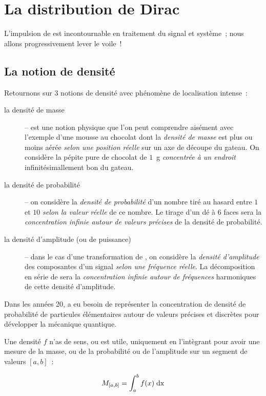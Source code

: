 \chapter{La distribution de Dirac}
\label{sec:dirac}

L'impulsion de \Dirac{} est incontournable en traitement du signal et
système~; nous allons progressivement lever le voile~!

\section{La notion de densité}

Retournons sur 3 notions de densité avec phénomène de localisation
intense~:
\begin{description}
\item [la densité de masse] -- est une notion physique que l'on peut
  comprendre aisément avec l'exemple d'une mousse au chocolat dont la
  \emph{densité de masse} est plus ou moins aérée \emph{selon une
    position réelle} sur un axe de découpe du gateau. On considère la
  pépite pure de chocolat de $1$~g \emph{concentrée à un endroit}
  infinitésimallement bon du gateau.
\item[la densité de probabilité] -- on considère la \emph{densité de
    probabilité} d'un nombre tiré au hasard entre $1$ et $10$\emph{
    selon la valeur réelle} de ce nombre. Le tirage d'un dé à 6 faces
  sera la \emph{concentration infinie autour de valeurs précises} de
  la densité de probabilité.
\item[la densité d'amplitude (ou de puissance)] -- dans le cas d'une
  transformation de \Fourier, on considère la \emph{densité
    d'amplitude} des composantes d'un signal \emph{selon une fréquence
    réelle}. La décomposition en série de \Fourier{} sera la
  \emph{concentration infinie autour de fréquences} harmoniques de
  cette densité d'amplitude.
\end{description}


Dans les années 20, \Dirac{} a eu besoin de représenter la
concentration de densité de probabilité de particules élémentaires
autour de valeurs précises et discrètes pour développer la mécanique
quantique.

Une densité $f$ n'as de sens, ou est utile, uniquement en l'intègrant
pour avoir une \og{} mesure\fg{} de la masse, ou de la probabilité ou
de l'amplitude sur un segment de valeurs $[a, b]$~:

\begin{equation}
  \label{eq:densite_mesure}
  M_{[a, b]} = \int_a^b f(x)\;\mathrm{d{x}}
\end{equation}

